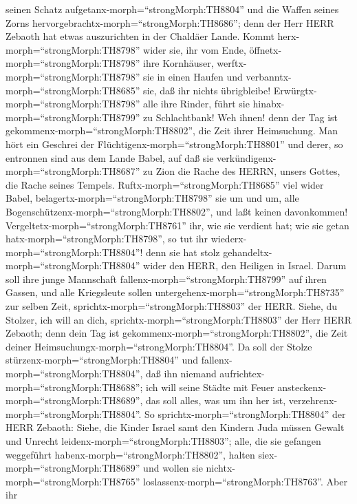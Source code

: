 seinen Schatz aufgetanx-morph=``strongMorph:TH8804'' und die Waffen
seines Zorns hervorgebrachtx-morph=``strongMorph:TH8686''; denn der Herr
HERR Zebaoth hat etwas auszurichten in der Chaldäer Lande. 
Kommt herx-morph=``strongMorph:TH8798'' wider sie, ihr vom Ende,
öffnetx-morph=``strongMorph:TH8798'' ihre Kornhäuser,
werftx-morph=``strongMorph:TH8798'' sie in einen Haufen und
verbanntx-morph=``strongMorph:TH8685'' sie, daß ihr nichts übrigbleibe!
 Erwürgtx-morph=``strongMorph:TH8798'' alle ihre Rinder,
führt sie hinabx-morph=``strongMorph:TH8799'' zu Schlachtbank! Weh
ihnen! denn der Tag ist gekommenx-morph=``strongMorph:TH8802'', die Zeit
ihrer Heimsuchung.  Man hört ein Geschrei der
Flüchtigenx-morph=``strongMorph:TH8801'' und derer, so entronnen sind
aus dem Lande Babel, auf daß sie
verkündigenx-morph=``strongMorph:TH8687'' zu Zion die Rache des HERRN,
unsers Gottes, die Rache seines Tempels. 
Ruftx-morph=``strongMorph:TH8685'' viel wider Babel,
belagertx-morph=``strongMorph:TH8798'' sie um und um, alle
Bogenschützenx-morph=``strongMorph:TH8802'', und laßt keinen
davonkommen! Vergeltetx-morph=``strongMorph:TH8761'' ihr, wie sie
verdient hat; wie sie getan hatx-morph=``strongMorph:TH8798'', so tut
ihr wiederx-morph=``strongMorph:TH8804''! denn sie hat stolz
gehandeltx-morph=``strongMorph:TH8804'' wider den HERR, den Heiligen in
Israel.  Darum soll ihre junge Mannschaft
fallenx-morph=``strongMorph:TH8799'' auf ihren Gassen, und alle
Kriegsleute sollen untergehenx-morph=``strongMorph:TH8735'' zur selben
Zeit, sprichtx-morph=``strongMorph:TH8803'' der HERR. 
Siehe, du Stolzer, ich will an dich,
sprichtx-morph=``strongMorph:TH8803'' der Herr HERR Zebaoth; denn dein
Tag ist gekommenx-morph=``strongMorph:TH8802'', die Zeit deiner
Heimsuchungx-morph=``strongMorph:TH8804''.  Da soll der
Stolze stürzenx-morph=``strongMorph:TH8804'' und
fallenx-morph=``strongMorph:TH8804'', daß ihn niemand
aufrichtex-morph=``strongMorph:TH8688''; ich will seine Städte mit Feuer
ansteckenx-morph=``strongMorph:TH8689'', das soll alles, was um ihn her
ist, verzehrenx-morph=``strongMorph:TH8804''.  So
sprichtx-morph=``strongMorph:TH8804'' der HERR Zebaoth: Siehe, die
Kinder Israel samt den Kindern Juda müssen Gewalt und Unrecht
leidenx-morph=``strongMorph:TH8803''; alle, die sie gefangen weggeführt
habenx-morph=``strongMorph:TH8802'', halten
siex-morph=``strongMorph:TH8689'' und wollen sie
nichtx-morph=``strongMorph:TH8765''
loslassenx-morph=``strongMorph:TH8763''.  Aber ihr
